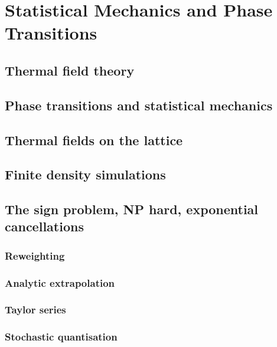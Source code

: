 \chapter{Statistical Mechanics and Phase Transitions}

\section{Thermal field theory}
\section{Phase transitions and statistical mechanics}
\section{Thermal fields on the lattice}
\section{Finite density simulations}
\section{The sign problem, NP hard, exponential cancellations}
\subsection{Reweighting}
\subsection{Analytic extrapolation}
\subsection{Taylor series}
\subsection{Stochastic quantisation}
